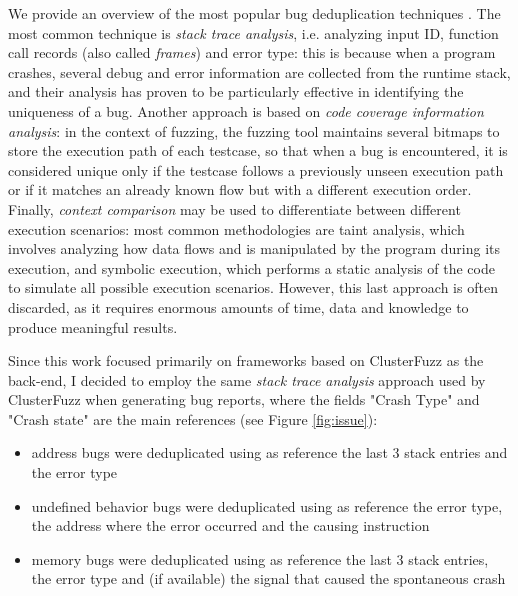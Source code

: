 We provide an overview of the most popular bug deduplication techniques \cite{dedup_survey}.
The most common technique is \textit{stack trace analysis}, i.e. analyzing input ID, function call records (also called \textit{frames}) and error type: this is because when a program crashes, several debug and error information are collected from the runtime stack, and their analysis has proven to be particularly effective in identifying the uniqueness of a bug.
Another approach is based on \textit{code coverage information analysis}: in the context of fuzzing, the fuzzing tool maintains several bitmaps to store the execution path of each testcase, so that when a bug is encountered, it is considered unique only if the testcase follows a previously unseen execution path or if it matches an already known flow but with a different execution order.
Finally, \textit{context comparison} may be used to differentiate between different execution scenarios: most common methodologies are taint analysis, which involves analyzing how data flows and is manipulated by the program during its execution, and symbolic execution, which performs a static analysis of the code to simulate all possible execution scenarios. However, this last approach is often discarded, as it requires enormous amounts of time, data and knowledge to produce meaningful results.
\newline

Since this work focused primarily on frameworks based on ClusterFuzz as the back-end, I decided to employ the same \textit{stack trace analysis} approach used by ClusterFuzz when generating bug reports, where the fields "Crash Type" and "Crash state" are the main references (see Figure \ref{fig:issue}):
\begin{itemize}
    \item address bugs were deduplicated using as reference the last 3 stack entries and the error type
    \item undefined behavior bugs were deduplicated using as reference the error type, the address where the error occurred and the causing instruction
    \item memory bugs were deduplicated using as reference the last 3 stack entries, the error type and (if available) the signal that caused the spontaneous crash
\end{itemize}